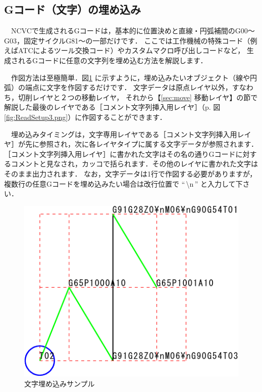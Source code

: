 \subsection{Gコード（文字）の埋め込み}
　NCVCで生成されるGコードは，基本的に位置決めと直線・円弧補間のG00～G03，固定サイクルG81～の一部だけです．
ここでは工作機械の特殊コード（例えばATCによるツール交換コード）やカスタムマクロ呼び出しコードなど，
生成されるGコードに任意の文字列を埋め込む方法を解説します．

\begin{minipage}[t]{0.5\textwidth}
　作図方法は至極簡単．図\ref{fig:moji.pdf} に示すように，埋め込みたいオブジェクト（線や円弧）の端点に文字を作図するだけです．
文字データは原点レイヤ以外，すなわち，切削レイヤと２つの移動レイヤ，
それから【\ref{sec:move} 移動レイヤ】の節で解説した最後のレイヤである［コメント文字列挿入用レイヤ］（p.\pageref{fig:ReadSetup3.png} 図\ref{fig:ReadSetup3.png}）に作図することができます．

　埋め込みタイミングは，文字専用レイヤである［コメント文字列挿入用レイヤ］が先に参照され，次に各レイヤタイプに属する文字データが参照されます．
［コメント文字列挿入用レイヤ］に書かれた文字はその名の通りGコードに対するコメントと見なされ，カッコで括られます．その他のレイヤに書かれた文字はそのまま出力されます．
なお，文字データは1行で作図する必要がありますが，複数行の任意Gコードを埋め込みたい場合は改行位置で ``\,\textbackslash n\,'' と入力して下さい．
\end{minipage}
\begin{minipage}[t]{0.5\textwidth}
\vspace*{-1zh}
\begin{figure}[H]
\centering
\includegraphics{No3/fig/moji-crop.pdf}
\caption{文字埋め込みサンプル}
\label{fig:moji.pdf}
\end{figure}
\end{minipage}

